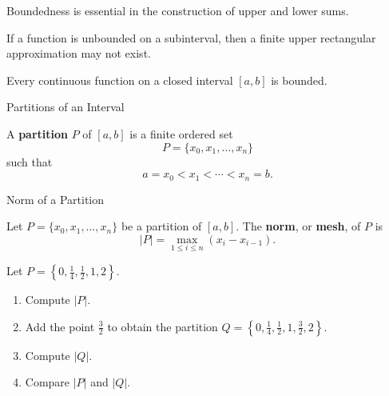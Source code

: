 \documentclass[12pt,a4paper]{article}
\begin{document}
Boundedness is essential in the construction of upper and lower sums.

If a function is unbounded on a subinterval, then a finite upper
rectangular approximation may not exist.

\vspace{15pt}

\begin{theorem}
Every continuous function on a closed interval $[a,b]$ is bounded.
\end{theorem}

\clearpage

\begin{heading}
Partitions of an Interval
\end{heading}

\begin{definition}[Partition]
A \textbf{partition} $P$ of $[a,b]$ is a finite ordered set
\[
P=\{x_0,x_1,\dots,x_n\}
\]
such that
\[
a=x_0<x_1<\cdots<x_n=b.
\]
\end{definition}


\clearpage

\begin{heading}
Norm of a Partition
\end{heading}

\begin{definition}
Let
\(
P=\{x_0,x_1,\dots,x_n\}
\)
be a partition of $[a,b]$. The \textbf{norm}, or \textbf{mesh}, of $P$ is
\[
|P|
=
\max_{1\le i\le n}
(x_i-x_{i-1}).
\]

\end{definition}

\vspace{100pt}

\begin{problem}
Let
\(
P=
\left\{
0,\frac14,\frac12,1,2
\right\}.
\)

\begin{enumerate}
    \item Compute $|P|$.

    \item Add the point $\frac32$ to obtain the partition
    \(
    Q=
    \left\{
    0,\frac14,\frac12,1,\frac32,2
    \right\}.
    \)

    \item Compute $|Q|$.

    \item Compare $|P|$ and $|Q|$.
\end{enumerate}
\end{problem}
\end{document}
